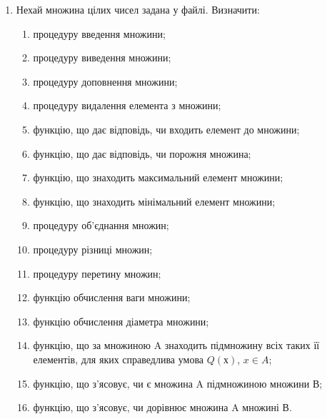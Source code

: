 \documentclass[]{article}
\makeatletter
\newcommand{\xslalph}[1]{\expandafter\@xslalph\csname c@#1\endcsname}
\newcommand{\@xslalph}[1]{%
    \ifcase#1\or а\or б\or в\or г\or д\or e\or є\or ж\or з\or i%
    \or й\or к\or л\or м\or н\or о\or п\or р\or с\or т%
    \or у\or ф\or х\or ц\or ч\or ш\or ю\or я\or аа\or бб\or вв %
    \else\@ctrerr\fi%
}
\makeatother
\begin{document}
\begin{enumerate}
\item
Нехай множина цілих чисел задана у файлі. Визначити:
\begin{enumerate}[label=\xslalph*)]
\item
процедуру введення множини;
\item процедуру виведення множини;
\item процедуру доповнення множини;
\item процедуру видалення елемента з множини;
\item функцію, що дає відповідь, чи входить елемент до множини;
\item функцію, що дає відповідь, чи порожня множина;
\item функцію, що знаходить максимальний елемент множини;
\item функцію, що знаходить мінімальний елемент множини;
\item процедуру об'єднання множин;
\item процедуру різниці множин;
\item процедуру перетину множин;
\item функцію обчислення ваги множини;
\item функцію обчислення діаметра множини;
\item функцію, що за множиною A знаходить підмножину всіх таких її
елементів, для яких справедлива умова $Q(х)$, $x\in A$;
\item функцію, що з'ясовує, чи є множина A підмножиною множини В;
\item функцію, що з'ясовує, чи дорівнює множина A множині В.
\end{enumerate}


\end{enumerate}
\end{document}
